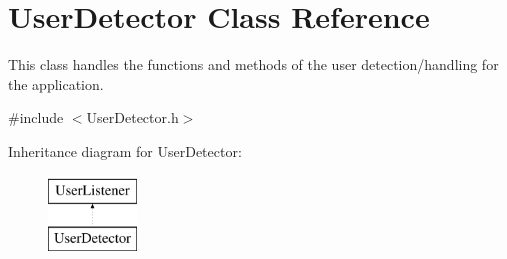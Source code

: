 \hypertarget{classUserDetector}{
\section{UserDetector Class Reference}
\label{classUserDetector}
}


This class handles the functions and methods of the user detection/handling for the application.  




{\ttfamily \#include $<$UserDetector.h$>$}

Inheritance diagram for UserDetector:\begin{figure}[H]
\begin{center}
\leavevmode
\includegraphics[height=2cm]{classUserDetector}
\end{center}
\end{figure}
